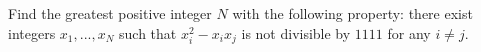 Find the greatest positive integer $N$ with the following property: there exist integers $x_1, . . . , x_N$ such that $x^2_i - x_ix_j$ is not divisible by $1111$ for any $i\ne j.$